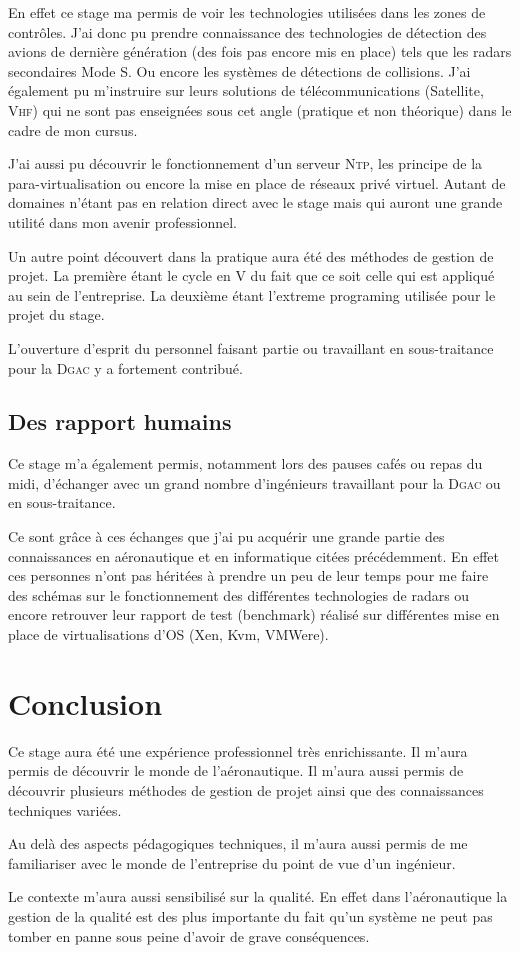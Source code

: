 En effet ce stage ma permis de voir les technologies utilisées dans les zones de contrôles. J'ai donc pu prendre connaissance des technologies de détection des avions de dernière génération (des fois pas encore mis en place) tels que les radars secondaires Mode S. Ou encore les systèmes de détections de collisions. J'ai également pu m'instruire sur leurs solutions de télécommunications (Satellite, \textsc{Vhf}) qui ne sont pas enseignées sous cet angle (pratique et non théorique) dans le cadre de mon cursus.

J'ai aussi pu découvrir le fonctionnement d'un serveur \textsc{Ntp}, les principe de la para-virtualisation ou encore la mise en place de réseaux privé virtuel. Autant de domaines n'étant pas en relation direct avec le stage mais qui auront une grande utilité dans mon avenir professionnel. 

Un autre point découvert dans la pratique aura été des méthodes de gestion de projet. La première étant le cycle en V du fait que ce soit celle qui est appliqué au sein de l'entreprise. La deuxième étant l'extreme programing utilisée pour le projet du stage.

L'ouverture d'esprit du personnel faisant partie ou travaillant en sous-traitance pour la \textsc{Dgac} y a fortement contribué. 

    \subsection{Des rapport humains}
Ce stage m'a également permis, notamment lors des pauses cafés ou repas du midi, d'échanger avec un grand nombre d'ingénieurs travaillant pour la \textsc{Dgac} ou en sous-traitance. 

Ce sont grâce à ces échanges que j'ai pu acquérir une grande partie des connaissances en aéronautique et en informatique citées précédemment. En effet ces personnes n'ont pas héritées à prendre un peu de leur temps pour me faire des schémas sur le fonctionnement des différentes technologies de radars ou encore retrouver leur rapport de test (benchmark) réalisé sur différentes mise en place de virtualisations d'OS (Xen, Kvm, VMWere). 

\section{Conclusion}
Ce stage aura été une expérience professionnel très enrichissante. Il m'aura permis de découvrir le monde de l'aéronautique. Il m'aura aussi permis de découvrir plusieurs méthodes de gestion de projet ainsi que des connaissances techniques variées.

Au delà des aspects pédagogiques techniques, il m'aura aussi permis de me familiariser avec le monde de l'entreprise du point de vue d'un ingénieur. 

Le contexte m'aura aussi sensibilisé sur la qualité. En effet dans l'aéronautique la gestion de la qualité est des plus importante du fait qu'un système ne peut pas tomber en panne sous peine d'avoir de grave conséquences. 
 









